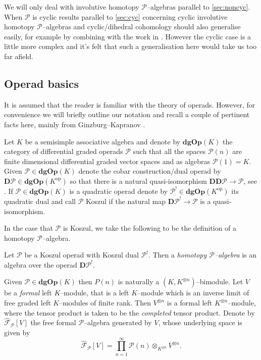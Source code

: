 \documentclass[british]{amsart}
\theoremstyle{plain}
\theoremstyle{definition}
{
\newaliascnt{{definition}}{theorem}\newtheorem{{definition}}[{definition}]{{Definition}}\aliascntresetthe{{definition}}\expandafterautorefname\endcsname{{Definition}}}
{
\newaliascnt{{remark}}{theorem}\newtheorem{{remark}}[{remark}]{{Remark}}\aliascntresetthe{{remark}}\expandafterautorefname\endcsname{{Remark}}}
{
\newaliascnt{{example}}{theorem}\newtheorem{{example}}[{example}]{{Example}}\aliascntresetthe{{example}}\expandafterautorefname\endcsname{{Example}}}
{
\newaliascnt{{examples}}{theorem}\newtheorem{{examples}}[{examples}]{{Examples}}\aliascntresetthe{{examples}}\expandafterautorefname\endcsname{{Examples}}}
{
\newaliascnt{{notation}}{theorem}\newtheorem{{notation}}[{notation}]{{Notation}}\aliascntresetthe{{notation}}\expandafterautorefname\endcsname{{Notation}}}
{
\newaliascnt{{convention}}{theorem}\newtheorem{{convention}}[{convention}]{{Convention}}\aliascntresetthe{{convention}}\expandafterautorefname\endcsname{{Convention}}}
\numberwithin{equation}{section}
\numberwithin{figure}{section}
\begin{document}
\begin{remark}
We will only deal with involutive homotopy $\mathcal{P}$--algebras parallel to \autoref{sec:noncyc}. When $\mathcal{P}$ is cyclic results parallel to \autoref{sec:cyc} concerning cyclic involutive homotopy $\mathcal{P}$--algebras and cyclic/dihedral cohomology should also generalise easily, for example by combining with the work in \cite{getzlerkapranov1995:cyclicoperads}. However the cyclic case is a little more complex and it's felt that such a generalisation here would take us too far afield.
\end{remark}

\subsection{Operad basics}
It is assumed that the reader is familiar with the theory of operads. However, for convenience we will briefly outline our notation and recall a couple of pertinent facts here, mainly from Ginzburg--Kapranov \cite{ginzburgkapranov1994:koszuloperads}.

Let $K$ be a semisimple associative algebra and denote by ${\mathbf{dgOp}}(K)$ the category of differential graded operads $\mathcal{P}$ such that all the spaces $\mathcal{P}(n)$ are finite dimensional differential graded vector spaces and as algebras $\mathcal{P}(1)=K$. Given $\mathcal{P}\in{\mathbf{dgOp}}(K)$ denote the cobar construction/dual operad by ${\mathbf{D}}{\mathcal{P}}\in{\mathbf{dgOp}}(K^{\mathrm{op}})$ so that there is a natural quasi-isomorphism ${\mathbf{D}}{\mathbf{D}}\mathcal{P}\rightarrow\mathcal{P}$, see \cite{ginzburgkapranov1994:koszuloperads}. If $\mathcal{P}\in{\mathbf{dgOp}}(K)$ is a quadratic operad denote by $\mathcal{P}^!\in{\mathbf{dgOp}}(K^{\mathrm{op}})$ its quadratic dual and call $\mathcal{P}$ Koszul if the natural map ${\mathbf{D}}\mathcal{P}^!\rightarrow\mathcal{P}$ is a quasi-isomorphism.

In the case that $\mathcal{P}$ is Koszul, we take the following to be the definition of a homotopy $\mathcal{P}$--algebra.

\begin{definition}
Let $\mathcal{P}$ be a Koszul operad with Koszul dual $\mathcal{P}^!$. Then a \emph{homotopy $\mathcal{P}$--algebra} is an algebra over the operad ${\mathbf{D}}\mathcal{P}^!$.
\end{definition}

Given $\mathcal{P}\in{\mathbf{dgOp}}(K)$ then $P(n)$ is naturally a $(K, K^{\otimes n})$--bimodule. Let $V$ be a \emph{formal} left $K$--module, that is a left $K$--module which is an inverse limit of free graded left $K$--modules of finite rank. Then $V^{\otimes n}$ is a formal left $K^{\otimes n}$--module, where the tensor product is taken to be the \emph{completed} tensor product. Denote by ${\widehat{\mathcal{F}}_{{\mathcal{P}}}[{V}]}$ the free formal $\mathcal{P}$--algebra generated by $V$, whose underlying space is given by
\[
{\widehat{\mathcal{F}}_{{\mathcal{P}}}[{V}]} = \prod_{n=1}^{\infty} \mathcal{P}(n)\otimes_{K^{\otimes n}} V^{\otimes n}.
\]
\end{document}
